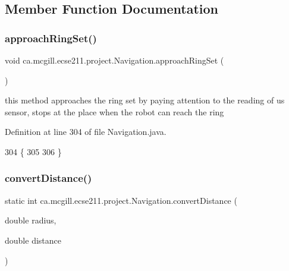 \subsection{Member Function Documentation}
\mbox{\label{classca_1_1mcgill_1_1ecse211_1_1project_1_1_navigation_a1d8075346dbc151ca366e211e9056ccc}} 
\subsubsection{\texorpdfstring{approach\+Ring\+Set()}{approachRingSet()}}
{\footnotesize\ttfamily void ca.\+mcgill.\+ecse211.\+project.\+Navigation.\+approach\+Ring\+Set (\begin{DoxyParamCaption}{ }\end{DoxyParamCaption})}

this method approaches the ring set by paying attention to the reading of us sensor, stops at the place when the robot can reach the ring 

Definition at line 304 of file Navigation.\+java.


\begin{DoxyCode}
304                                 \{
305     
306   \}
\end{DoxyCode}
\mbox{\label{classca_1_1mcgill_1_1ecse211_1_1project_1_1_navigation_ac9e260bcd619ffa4820d7d0de7ea1c12}} 
\subsubsection{\texorpdfstring{convert\+Distance()}{convertDistance()}}
{\footnotesize\ttfamily static int ca.\+mcgill.\+ecse211.\+project.\+Navigation.\+convert\+Distance (\begin{DoxyParamCaption}\item[{double}]{radius,  }\item[{double}]{distance }\end{DoxyParamCaption})\hspace{0.3cm}{\ttfamily [static]}}

